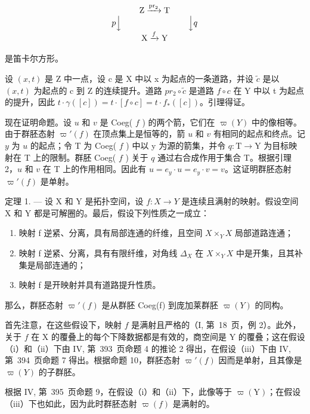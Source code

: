\[
\begin{array}{c} \mathrm{Z} \xrightarrow {\mathrm{pr} _ {2}} \mathrm{T} \\ p \Big \downarrow \qquad \qquad \qquad \qquad \Big \downarrow q \\ \mathrm{X} \xrightarrow {f} \mathrm{Y} \end{array}
\]

是笛卡尔方形。

设 \((x,t)\) 是 Z 中一点，设 c 是 X 中以 x 为起点的一条道路，并设 \(\widetilde{c}\) 是以 \((x,t)\) 为起点的 c 到 Z 的连续提升。道路 \(pr_{2} \circ \widetilde{c}\) 是道路 \(f \circ c\) 在 Y 中以 t 为起点的提升，因此 \(t \cdot \gamma([c]) = t \cdot [f \circ c] = t \cdot f_{*}([c])\)。引理得证。

现在证明命题。设 \(u\) 和 \(v\) 是 Coeg( \(f\) ) 的两个箭，它们在 \(\varpi(Y)\) 中的像相等。由于群胚态射 \(\varpi'(f)\) 在顶点集上是恒等的，箭 \(u\) 和 \(v\) 有相同的起点和终点。记 \(y\) 为 \(u\) 的起点；令 T 为 Coeg( \(f\) ) 中以 y 为源的箭集，并令 \(q: \mathrm{T} \to \mathrm{Y}\) 为目标映射在 T 上的限制。群胚 Coeg( \(f\) ) 关于 \(q\) 通过右合成作用于集合 T。根据引理 2，\(u\) 和 \(v\) 在 T 上的作用相同。因此有 \(u = e_y \cdot u = e_y \cdot v = v\)。这证明群胚态射 \(\varpi'(f)\) 是单射。

定理 1. --- 设 X 和 Y 是拓扑空间，设 \(f: X \to Y\) 是连续且满射的映射。假设空间 X 和 Y 都是可解圈的。最后，假设下列性质之一成立：

\begin{enumerate}
\def\labelenumi{(\roman{enumi})}
\item
  映射 f 逆紧、分离，具有局部连通的纤维，且空间 \(X\times_{Y}X\) 局部道路连通；
\item
  映射 f 逆紧、分离，具有有限纤维，对角线 \(\Delta_{X}\) 在 \(X \times_{Y} X\) 中是开集，且其补集是局部连通的；
\item
  映射 f 是开映射并具有道路提升性质。
\end{enumerate}

那么，群胚态射 \(\varpi'(f)\) 是从群胚 Coeg(f) 到庞加莱群胚 \(\varpi(Y)\) 的同构。

首先注意，在这些假设下，映射 \(f\) 是满射且严格的（I, 第~18~页，例 2）。此外，关于 \(f\) 在 X 的覆叠上的每个下降数据都是有效的，商空间是 Y 的覆叠；这在假设（i）和（ii）下由 IV, 第~393~页命题 4 的推论 2 得出，在假设（iii）下由 IV, 第~394~页命题 7 得出。根据命题 10，群胚态射 \(\varpi'(f)\) 因而是单射，且其像是 \(\varpi(Y)\) 的子群胚。

根据 IV, 第~395~页命题 9，在假设（i）和（ii）下，此像等于 \(\varpi(\mathrm{Y})\)；在假设（iii）下也如此，因为此时群胚态射 \(\varpi(f)\) 是满射的。

